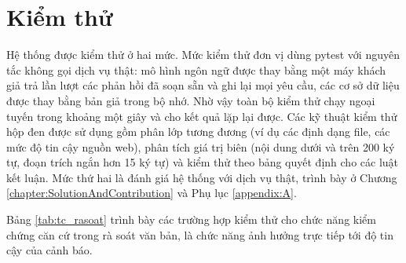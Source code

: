 \documentclass[../DoAn.tex]{subfiles}
\begin{document}

\section{Kiểm thử}
\label{section:4.4}
Hệ thống được kiểm thử ở hai mức. Mức kiểm thử đơn vị dùng pytest với nguyên tắc không gọi dịch vụ thật: mô hình ngôn ngữ được thay bằng một máy khách giả trả lần lượt các phản hồi đã soạn sẵn và ghi lại mọi yêu cầu, các cơ sở dữ liệu được thay bằng bản giả trong bộ nhớ. Nhờ vậy toàn bộ kiểm thử chạy ngoại tuyến trong khoảng một giây và cho kết quả lặp lại được. Các kỹ thuật kiểm thử hộp đen được sử dụng gồm phân lớp tương đương (ví dụ các định dạng file, các mức độ tin cậy nguồn web), phân tích giá trị biên (nội dung dưới và trên 200 ký tự, đoạn trích ngắn hơn 15 ký tự) và kiểm thử theo bảng quyết định cho các luật kết luận. Mức thứ hai là đánh giá hệ thống với dịch vụ thật, trình bày ở Chương \ref{chapter:SolutionAndContribution} và Phụ lục \ref{appendix:A}.

Bảng \ref{tab:tc_rasoat} trình bày các trường hợp kiểm thử cho chức năng kiểm chứng căn cứ trong rà soát văn bản, là chức năng ảnh hưởng trực tiếp tới độ tin cậy của cảnh báo.
\end{document}
